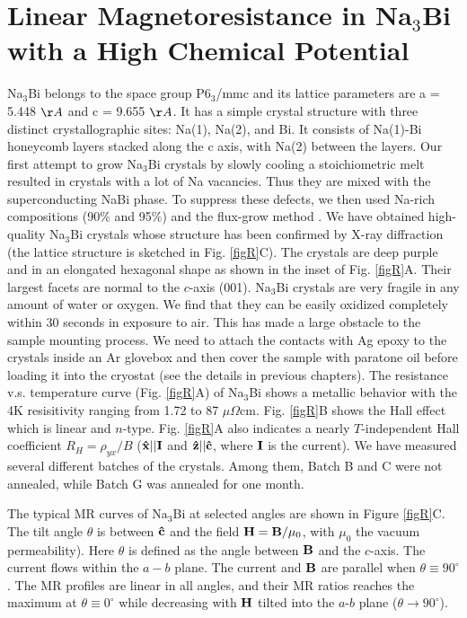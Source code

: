 \section{Linear Magnetoresistance in Na$_3$Bi with a High Chemical Potential}
\label{sec:na3bi:lmr}


Na$_3$Bi belongs to the space group P6$_3$/mmc and its lattice parameters are a = 5.448 $\AA$ and c = 9.655 $\AA$. It has a simple crystal structure with three distinct crystallographic sites: Na(1), Na(2), and Bi. It consists of Na(1)-Bi honeycomb layers stacked along the c axis, with Na(2) between the layers. Our first attempt to grow Na$_3$Bi crystals by slowly cooling a stoichiometric melt resulted in crystals with a lot of Na vacancies. Thus they are mixed with the superconducting NaBi phase. To suppress these defects, we then used Na-rich compositions (90$\%$ and 95$\%$) and the flux-grow method \cite{Kushwaha}. We have obtained high-quality Na$_3$Bi crystals whose structure has been confirmed by X-ray diffraction (the lattice structure is sketched in Fig. \ref{figR}C). The crystals are deep purple and in an elongated hexagonal shape as shown in the inset of Fig. \ref{figR}A. Their largest facets are normal to the $c$-axis (001). Na$_3$Bi crystals are very fragile in any amount of water or oxygen. We find that they can be easily oxidized completely within 30 seconds in exposure to air. This has made a large obstacle to the sample mounting process. We need to attach the contacts with Ag epoxy to the crystals inside an Ar glovebox and then cover the sample with paratone oil before loading it into the cryostat (see the details in previous chapters). The resistance v.s. temperature curve (Fig. \ref{figR}A) of Na$_3$Bi shows a metallic behavior with the 4K resisitivity ranging from 1.72 to 87 $\mu\Omega$cm. Fig. \ref{figR}B shows the Hall effect which is linear and $n$-type. Fig. \ref{figR}A also indicates a nearly $T$-independent Hall coefficient $R_H = \rho_{yx}/B$ ($\bf\hat{x}||I$ and $\bf\hat{z}||\hat{c}$, where $\bf I$ is the current). We have measured several different batches of the crystals. Among them, Batch B and C were not annealed, while Batch G was annealed for one month. 

The typical MR curves of Na$_3$Bi at selected angles are shown in Figure \ref{figR}C. The tilt angle $\theta$ is between $\bf\hat{c}$ and the field ${\bf H}={\bf B}/\mu_0$, with $\mu_0$ the vacuum permeability). Here $\theta$ is defined as the angle between $\bf B$ and the $c$-axis. The current flows within the $a-b$ plane. The current and $\bf B$ are parallel when $\theta \equiv 90^\circ$. The MR profiles are linear in all angles, and their MR ratios reaches the maximum at $\theta \equiv 0^\circ$ while decreasing with $\bf H$ tilted into the $a$-$b$ plane ($\theta\to 90^\circ$). 

